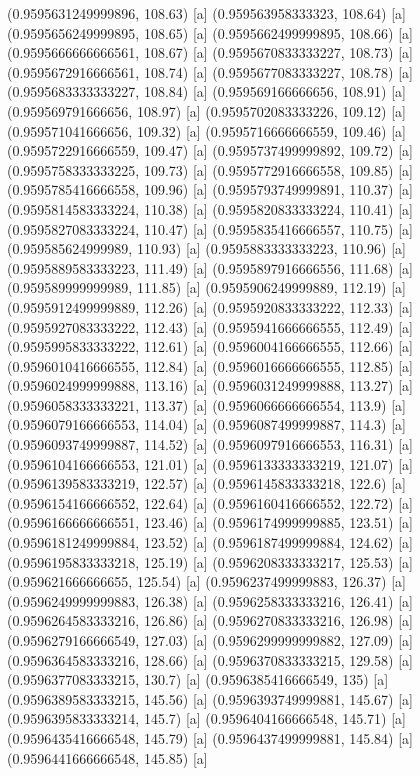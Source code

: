 {{{(0.9595631249999896, 108.63) [a] 
(0.959563958333323, 108.64) [a] 
(0.9595656249999895, 108.65) [a] 
(0.9595662499999895, 108.66) [a] 
(0.9595666666666561, 108.67) [a] 
(0.9595670833333227, 108.73) [a] 
(0.9595672916666561, 108.74) [a] 
(0.9595677083333227, 108.78) [a] 
(0.9595683333333227, 108.84) [a] 
(0.959569166666656, 108.91) [a] 
(0.959569791666656, 108.97) [a] 
(0.9595702083333226, 109.12) [a] 
(0.959571041666656, 109.32) [a] 
(0.9595716666666559, 109.46) [a] 
(0.9595722916666559, 109.47) [a] 
(0.9595737499999892, 109.72) [a] 
(0.9595758333333225, 109.73) [a] 
(0.9595772916666558, 109.85) [a] 
(0.9595785416666558, 109.96) [a] 
(0.9595793749999891, 110.37) [a] 
(0.9595814583333224, 110.38) [a] 
(0.9595820833333224, 110.41) [a] 
(0.9595827083333224, 110.47) [a] 
(0.9595835416666557, 110.75) [a] 
(0.959585624999989, 110.93) [a] 
(0.9595883333333223, 110.96) [a] 
(0.9595889583333223, 111.49) [a] 
(0.9595897916666556, 111.68) [a] 
(0.959589999999989, 111.85) [a] 
(0.9595906249999889, 112.19) [a] 
(0.9595912499999889, 112.26) [a] 
(0.9595920833333222, 112.33) [a] 
(0.9595927083333222, 112.43) [a] 
(0.9595941666666555, 112.49) [a] 
(0.9595995833333222, 112.61) [a] 
(0.9596004166666555, 112.66) [a] 
(0.9596010416666555, 112.84) [a] 
(0.9596016666666555, 112.85) [a] 
(0.9596024999999888, 113.16) [a] 
(0.9596031249999888, 113.27) [a] 
(0.9596058333333221, 113.37) [a] 
(0.9596066666666554, 113.9) [a] 
(0.9596079166666553, 114.04) [a] 
(0.9596087499999887, 114.3) [a] 
(0.9596093749999887, 114.52) [a] 
(0.9596097916666553, 116.31) [a] 
(0.9596104166666553, 121.01) [a] 
(0.9596133333333219, 121.07) [a] 
(0.9596139583333219, 122.57) [a] 
(0.9596145833333218, 122.6) [a] 
(0.9596154166666552, 122.64) [a] 
(0.9596160416666552, 122.72) [a] 
(0.9596166666666551, 123.46) [a] 
(0.9596174999999885, 123.51) [a] 
(0.9596181249999884, 123.52) [a] 
(0.9596187499999884, 124.62) [a] 
(0.9596195833333218, 125.19) [a] 
(0.9596208333333217, 125.53) [a] 
(0.959621666666655, 125.54) [a] 
(0.9596237499999883, 126.37) [a] 
(0.9596249999999883, 126.38) [a] 
(0.9596258333333216, 126.41) [a] 
(0.9596264583333216, 126.86) [a] 
(0.9596270833333216, 126.98) [a] 
(0.9596279166666549, 127.03) [a] 
(0.9596299999999882, 127.09) [a] 
(0.9596364583333216, 128.66) [a] 
(0.9596370833333215, 129.58) [a] 
(0.9596377083333215, 130.7) [a] 
(0.9596385416666549, 135) [a] 
(0.9596389583333215, 145.56) [a] 
(0.9596393749999881, 145.67) [a] 
(0.9596395833333214, 145.7) [a] 
(0.9596404166666548, 145.71) [a] 
(0.9596435416666548, 145.79) [a] 
(0.9596437499999881, 145.84) [a] 
(0.9596441666666548, 145.85) [a] 
}}}
